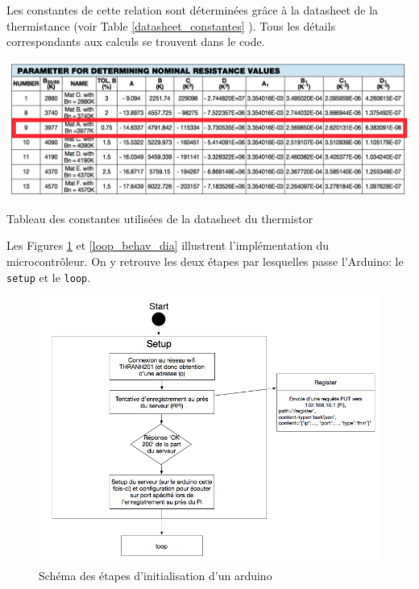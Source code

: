 \documentclass[11pt,a4paper,11pt]{report}
\begin{document}
Les constantes de cette relation sont déterminées grâce à la datasheet de la thermistance (voir Table \ref{datasheet_constantes} \cite{datash}). Tous les détails correspondants aux calculs se trouvent dans le code.\\


\begin{table}[h]
 \begin{center}
  \includegraphics[width=0.6\linewidth]{images/constantes.png}
  \caption{Tableau des constantes utilisées de la datasheet du thermistor}
  \label{datasheet_constantes}
 \end{center}
\end{table}

Les Figures \ref{setup_behav_dia} et \ref{loop_behav_dia} illustrent l'implémentation du microcontrôleur. On y retrouve les deux étapes par lesquelles passe l'Arduino: le \texttt{setup} et le \texttt{loop}.\\ 


\begin{figure}[h]
 \begin{center}
  \includegraphics[width=\linewidth]{images/setup_behav_dia.png}
  \caption{Schéma des étapes d'initialisation d'un arduino}
  \label{setup_behav_dia}
 \end{center}
\end{figure}
\end{document}
